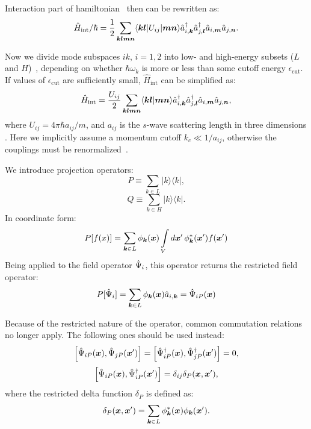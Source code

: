Interaction part of hamiltonian~ then can be rewritten as:
\begin{equation*}
	\hat{H}_{\mathrm{int}} / \hbar
	= \frac{1}{2} \sum\limits_{\boldsymbol{k} \boldsymbol{l} \boldsymbol{m} \boldsymbol{n}}
		\langle \boldsymbol{k} \boldsymbol{l} \lvert U_{ij} \rvert \boldsymbol{m} \boldsymbol{n} \rangle
		\hat{a}_{i,\boldsymbol{k}}^\dagger \hat{a}_{j,\boldsymbol{l}}^\dagger \hat{a}_{i,\boldsymbol{m}} \hat{a}_{j,\boldsymbol{n}}.
\end{equation*}

Now we divide mode subspaces $ik,\,i=1,2$ into low- and high-energy subsets
($L$ and $H$)~\cite{Morgan2000},
depending on whether $\hbar \omega_{k}$ is more or less than some cutoff energy $\epsilon_{\textrm{cut}}$.
If values of $\epsilon_{\textrm{cut}}$ are sufficiently small,
$\hat{H}_{\mathrm{int}}$ can be simplified as:
\begin{equation*}
	\hat{H}_{\mathrm{int}}
	= \frac{U_{ij}}{2} \sum\limits_{\boldsymbol{k} \boldsymbol{l} \boldsymbol{m} \boldsymbol{n}}
		\langle \boldsymbol{k} \boldsymbol{l} \vert \boldsymbol{m} \boldsymbol{n} \rangle
		\hat{a}_{i,\boldsymbol{k}}^\dagger \hat{a}_{j,\boldsymbol{l}}^\dagger \hat{a}_{i,\boldsymbol{m}} \hat{a}_{j,\boldsymbol{n}},
\end{equation*}
where $U_{ij} = 4 \pi \hbar a_{ij} / m$, and
$a_{ij}$ is the $s$-wave scattering length in three dimensions .
Here we implicitly assume a momentum cutoff $k_{c} \ll 1 / a_{ij}$,
otherwise the couplings must be renormalized~\cite{Sinatra2002}.

We introduce projection operators:
\[
	P \equiv \sum\limits_{k \in L} \lvert k \rangle \langle k \rvert,
\]
\[
	Q \equiv \sum\limits_{k \in H} \lvert k \rangle \langle k \rvert.
\]
In coordinate form:
\[
	P [f(x)]
	= \sum\limits_{\boldsymbol{k} \in L} \phi_{\boldsymbol{k}} (\boldsymbol{x}) \int\limits_V
		d\boldsymbol{x}^\prime\, \phi_{\boldsymbol{k}}^*(\boldsymbol{x}^\prime) f(\boldsymbol{x}^\prime)
\]
Being applied to the field operator $\hat{\Psi}_i$, this operator returns the restricted field operator:
\[
	P [\hat{\Psi}_i]
	= \sum\limits_{\boldsymbol{k} \in L} \phi_{\boldsymbol{k}} (\boldsymbol{x}) \hat{a}_{i,\boldsymbol{k}}
	= \hat{\Psi}_{iP} (\boldsymbol{x})
\]

Because of the restricted nature of the operator, common commutation relations no longer apply.
The following ones should be used instead:
\[
	\left[ \hat{\Psi}_{iP}(\boldsymbol{x}), \hat{\Psi}_{jP}(\boldsymbol{x}^\prime) \right]
	= \left[ \hat{\Psi}_{iP}^\dagger(\boldsymbol{x}), \hat{\Psi}_{jP}^\dagger(\boldsymbol{x}^\prime) \right] = 0,
\]
\[
	\left[ \hat{\Psi}_{iP}(\boldsymbol{x}), \hat{\Psi}_{iP}^\dagger(\boldsymbol{x}^\prime) \right]
	= \delta_{ij} \delta_{P}(\boldsymbol{x}, \boldsymbol{x}^\prime),
\]
where the restricted delta function $\delta_P$ is defined as:
\[
	\delta_{P}(\boldsymbol{x}, \boldsymbol{x}^\prime)
	= \sum\limits_{\boldsymbol{k} \in L} \phi_{\boldsymbol{k}}^* (\boldsymbol{x}) \phi_{\boldsymbol{k}} (\boldsymbol{x}^\prime).
\]

